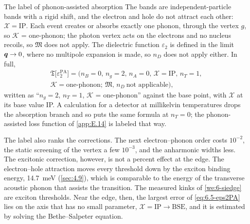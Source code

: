 \begin{workedexample}{The label of phonon-assisted absorption}
The bands are independent-particle bands with a rigid shift, and the electron and hole do not attract each other: $\mathcal{X} = \mathrm{IP}$. Each event creates or absorbs exactly one phonon, through the vertex $g$, so $\mathcal{K}$ = one-phonon; the photon vertex acts on the electrons and no nucleus recoils, so $\mathfrak{M}$ does not apply. The dielectric function $\varepsilon_2$ is defined in the limit $\bm{q} \to 0$, where no multipole expansion is made, so $n_D$ does not apply either. In full,
\begin{multline*}
  \mathfrak{T}\bigl[\varepsilon_2^{\mathrm{PA}}\bigr] = (n_B = 0,\, n_g = 2,\, n_A = 0,\, \mathcal{X} = \mathrm{IP},\, n_T = 1,\\
  \mathcal{K} = \text{one-phonon};\ \mathfrak{M},\, n_D\ \text{not applicable}) ,
\end{multline*}
written as ``$n_g = 2$, $n_T = 1$, $\mathcal{K}$ = one-phonon'' against the base point, with $\mathcal{X}$ at its base value IP. A calculation for a detector at millikelvin temperatures drops the absorption branch and so puts the same formula at $n_T = 0$; the phonon-assisted loss function of \cref{app:E.14} is labeled that way.

The label also ranks the corrections. The next electron--phonon order costs $10^{-2}$, the static screening of the vertex a few $10^{-3}$, and the anharmonic widths less. The excitonic correction, however, is not a percent effect at the edge. The electron--hole attraction moves every threshold down by the exciton binding energy, \SI{14.7}{meV} (\cref{sec:4.9}), which is comparable to the energy of the transverse acoustic phonon that assists the transition. The measured kinks of \cref{we:6-siedge} are exciton thresholds. Near the edge, then, the largest error of \cref{eq:6.5-eps2PA} lies on the axis that has no small parameter, $\mathcal{X} = \mathrm{IP} \to \mathrm{BSE}$, and it is estimated by solving the Bethe--Salpeter equation.
\end{workedexample}
